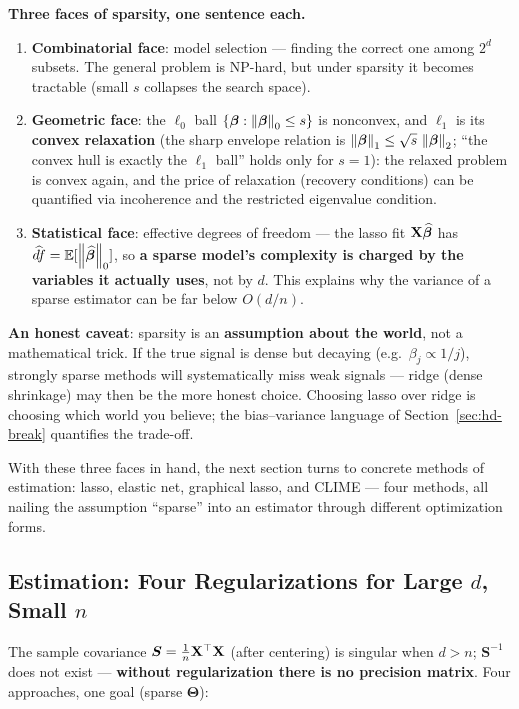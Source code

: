 \textbf{Three faces of sparsity, one sentence each.}
\begin{enumerate}[label=(\arabic*)]
  \item \textbf{Combinatorial face}: model selection — finding the correct one among $2^d$ subsets. The general problem is NP-hard, but under sparsity it becomes tractable (small $s$ collapses the search space).
  \item \textbf{Geometric face}: the $\ell_0$ ball $\{\bm{\beta} : \left\lVert \bm{\beta} \right\rVert_0 \le s\}$ is nonconvex, and $\ell_1$ is its \textbf{convex relaxation} (the sharp envelope relation is $\left\lVert \bm{\beta} \right\rVert_1 \le \sqrt{s}\,\left\lVert \bm{\beta} \right\rVert_2$; ``the convex hull is exactly the $\ell_1$ ball'' holds only for $s = 1$): the relaxed problem is convex again, and the price of relaxation (recovery conditions) can be quantified via incoherence and the restricted eigenvalue condition.
  \item \textbf{Statistical face}: effective degrees of freedom --- the lasso fit $\mathbf{X}\widehat{\bm{\beta}}$ has $\widehat{df} = \mathbb{E}[\left\lVert \widehat{\bm{\beta}} \right\rVert_0]$, so \textbf{a sparse model's complexity is charged by the variables it actually uses}, not by $d$. This explains why the variance of a sparse estimator can be far below $O(d/n)$.
\end{enumerate}

\textbf{An honest caveat}: sparsity is an \textbf{assumption about the world}, not a mathematical trick. If the true signal is dense but decaying (e.g.\ $\beta_j \propto 1/j$), strongly sparse methods will systematically miss weak signals — ridge (dense shrinkage) may then be the more honest choice. Choosing lasso over ridge is choosing which world you believe; the bias--variance language of Section~\ref{sec:hd-break} quantifies the trade-off.

With these three faces in hand, the next section turns to concrete methods of estimation: lasso, elastic net, graphical lasso, and CLIME — four methods, all nailing the assumption ``sparse'' into an estimator through different optimization forms.

\subsection{Estimation: Four Regularizations for Large $d$, Small $n$}\label{sec:ggm-estimate}

The sample covariance $\bm{S} = \frac{1}{n}\mathbf{X}^\top\mathbf{X}$ (after centering) is singular when $d > n$; $\bm{S}^{-1}$ does not exist — \textbf{without regularization there is no precision matrix}. Four approaches, one goal (sparse $\bm{\Theta}$):

